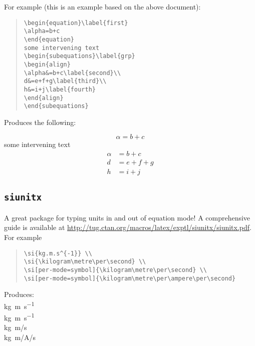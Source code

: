 For example (this is an example based on the above document):
\begin{quote}
\begin{verbatim}
\begin{equation}\label{first}
\alpha=b+c
\end{equation}
some intervening text
\begin{subequations}\label{grp}
\begin{align}
\alpha&=b+c\label{second}\\
d&=e+f+g\label{third}\\
h&=i+j\label{fourth}
\end{align}
\end{subequations}
\end{verbatim}
\end{quote}

Produces the following:

\begin{equation}\label{first}
\alpha=b+c
\end{equation}
some intervening text
\begin{subequations}\label{grp}
\begin{align}
\alpha &=b+c\label{second}\\
d&=e+f+g\label{third}\\
h&=i+j\label{fourth}
\end{align}
\end{subequations}


\subsection{{\tt siunitx}}
A great package for typing units in and out of equation mode! 
A comprehensive guide is available at 
\url{http://tug.ctan.org/macros/latex/exptl/siunitx/siunitx.pdf}. 
%
For example
\begin{quote}
\begin{verbatim}
\si{kg.m.s^{-1}} \\ 
\si{\kilogram\metre\per\second} \\ 
\si[per-mode=symbol]{\kilogram\metre\per\second} \\ 
\si[per-mode=symbol]{\kilogram\metre\per\ampere\per\second}
\end{verbatim}
\end{quote}
Produces:\\
%
\si{kg.m.s^{-1}} \\ \si{\kilogram\metre\per\second} \\ 
\si[per-mode=symbol]{\kilogram\metre\per\second} \\ 
\si[per-mode=symbol]{\kilogram\metre\per\ampere\per\second}


